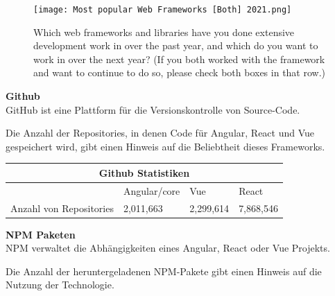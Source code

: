 \begin{figure}
  \centering
  \texttt{[image: Most popular Web Frameworks [Both] 2021.png]}
  \caption{ Which web frameworks and libraries have you done extensive development work in over the past year, and which do you want to work in over the next year? (If you both worked with the framework and want to continue to do so, please check both boxes in that row.) {\cite{SO01}}}

\end{figure}

\newpage

\begin{flushleft}
  \textbf{Github}\\
  GitHub ist eine Plattform für die Versionskontrolle von Source-Code. 
\end{flushleft}

Die Anzahl der Repositories, in denen Code für Angular, React und Vue gespeichert wird, gibt einen Hinweis auf die Beliebtheit dieses Frameworks.
\\
\begin{table}[h!]
  \centering
  \begin{tabular}{ |p{3cm}||p{3cm}|p{3.6cm}|p{3.6cm}|  }
    \hline
    \multicolumn{4}{|c|}{Github Statistiken}                        \\
    \hline
                            & Angular/core & Vue       & React     \\
    \hline
    Anzahl von     Repositories & 2,011,663     & 2,299,614 & 7,868,546
    \\
    \hline
  \end{tabular}
\end{table}

{\cite{GH01, GH02, GH03}}


\textbf{NPM Paketen}\\
NPM verwaltet die Abhängigkeiten eines Angular, React oder Vue Projekts.

Die Anzahl der heruntergeladenen NPM-Pakete gibt einen Hinweis auf die Nutzung der Technologie.

